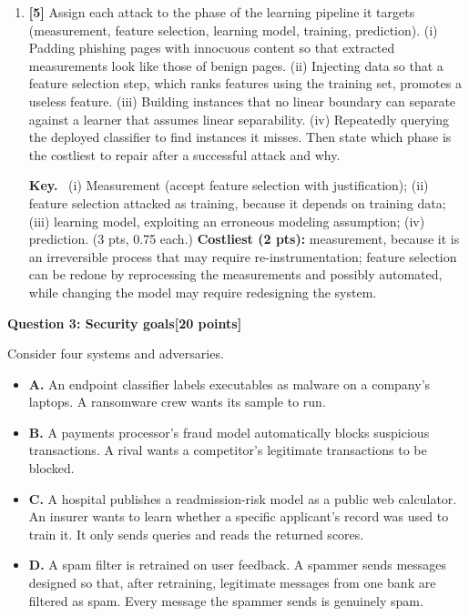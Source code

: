 \documentclass[10pt,a4paper]{extarticle}
\newcommand{\question}[3]{%
  \bigskip
  \begin{tcolorbox}[colback=navy!6, colframe=navy, boxrule=0.6pt, arc=1pt,
                    left=5pt, right=5pt, top=2pt, bottom=2pt]
    \textbf{\color{navy}Question #1: #2}\hfill\textbf{\color{accent}[#3 points]}
  \end{tcolorbox}\nopagebreak[4]}
\newcommand{\pts}[1]{\textbf{\color{accent}[#1]}\enspace}
\newenvironment{sol}{\par\smallskip
    \begin{tcolorbox}[colback=accent!6, colframe=accent, boxrule=0.5pt, arc=1pt,
                      left=5pt, right=5pt, top=2pt, bottom=2pt, breakable, fontupper=\small]
    \textbf{\color{accent}Key.}\ }{\end{tcolorbox}\par}
\begin{document}
\begin{enumerate}[label=(\alph*)]
\item \pts{5} Assign each attack to the phase of the learning pipeline it targets (measurement, feature selection, learning model, training, prediction). (i) Padding phishing pages with innocuous content so that extracted measurements look like those of benign pages. (ii) Injecting data so that a feature selection step, which ranks features using the training set, promotes a useless feature. (iii) Building instances that no linear boundary can separate against a learner that assumes linear separability. (iv) Repeatedly querying the deployed classifier to find instances it misses. Then state which phase is the costliest to repair after a successful attack and why.

\begin{sol}
(i) Measurement (accept feature selection with justification); (ii) feature selection attacked as training, because it depends on training data; (iii) learning model, exploiting an erroneous modeling assumption; (iv) prediction. (3 pts, 0.75 each.) \textbf{Costliest (2 pts):} measurement, because it is an irreversible process that may require re-instrumentation; feature selection can be redone by reprocessing the measurements and possibly automated, while changing the model may require redesigning the system.
\end{sol}
\end{enumerate}

\question{3}{Security goals}{20}

Consider four systems and adversaries.

\begin{itemize}[leftmargin=1.2cm, label={}]
\item \textbf{A.} An endpoint classifier labels executables as malware on a company's laptops. A ransomware crew wants its sample to run.
\item \textbf{B.} A payments processor's fraud model automatically blocks suspicious transactions. A rival wants a competitor's legitimate transactions to be blocked.
\item \textbf{C.} A hospital publishes a readmission-risk model as a public web calculator. An insurer wants to learn whether a specific applicant's record was used to train it. It only sends queries and reads the returned scores.
\item \textbf{D.} A spam filter is retrained on user feedback. A spammer sends messages designed so that, after retraining, legitimate messages from one bank are filtered as spam. Every message the spammer sends is genuinely spam.
\end{itemize}
\end{document}
